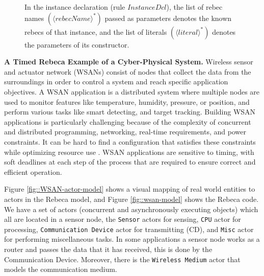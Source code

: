 \documentclass[
graybox,
envcountchap
]{svmult}
\begin{document}
\begin{bibunit}
\begin{figure}[!htbp]
\begin{center}
{ 		%
 		In the instance declaration (rule $InstanceDcl$), the list of rebec names $(\langle \mathit{rebecName} \rangle ^*)$ passed as parameters denotes the known rebecs of that instance, and the list of literals $(\langle literal \rangle ^*)$ denotes the parameters of its constructor.
 		 }
 		\label{fig::TRebecaSyntax}
 	\end{center}
 \end{figure}

\textbf{A Timed Rebeca Example of a Cyber-Physical System.} Wireless sensor and actuator network (WSANs) consist of  nodes that collect the data from the surroundings in order to control a system and reach specific application objectives.
A WSAN application is a distributed system where multiple nodes are used to monitor  features like temperature, humidity, pressure, or position, and  perform various tasks like smart detecting, and target tracking.
%
Building WSAN applications is particularly challenging  because of the complexity of concurrent and distributed programming, networking, real-time requirements, and power constraints. It can be hard to find a configuration that satisfies these constraints while optimizing resource use 
\cite{DBLP:journals/sttt/KhamespanahSMA18}. 
WSAN applications are sensitive to timing, with soft deadlines at each step of the process that are required to ensure correct and efficient operation.

Figure \ref{fig::WSAN-actor-model} shows a visual mapping of real world entities to actors in the Rebeca model, and Figure \ref{fig::wsan-model} shows the Rebeca code.
We have a set of actors (concurrent and asynchronously executing objects) which all are located in a sensor node, the \texttt{Sensor} actors for sensing, \texttt{CPU} actor for processing, \texttt{Communication Device} actor for transmitting (CD), and \texttt{Misc} actor for performing miscellaneous tasks. In some applications a sensor node works as a router and passes the data that it  has received, this is done by the Communication Device.
Moreover, there is the \texttt{Wireless Medium} actor that models the communication medium.


\end{bibunit}
\end{document}
